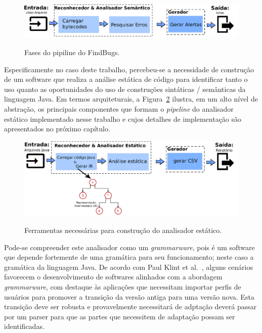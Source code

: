 \begin{figure}[h]
	\center
	\includegraphics[scale=0.9]{Imagens/pipelineFindbugs}
	\label{fig:findBugs}
	\caption{Fases do pipiline do FindBugs.}
\end{figure}


Especificamente no caso deste trabalho, percebeu-se a necessidade de construção de um software que 
realiza a análise estática de código para identificar tanto o uso quanto as oportunidades do uso de construções 
sintáticas / semânticas da linguagem Java. Em termos arquiteturais, a Figura~\ref{fig:stagesAnalyzer} ilustra, 
em um alto nível de abstração, os principais componentes que formam o \emph{pipeline} do analisador estático 
implementado nesse trabalho e cujos detalhes de implementação são apresentados no próximo capítulo.

\begin{figure}[h]
	\center
	\includegraphics[scale=0.9]{Imagens/stagesAnalizer}
	\label{fig:stagesAnalyzer}
	\caption{Ferramentas necessárias para construção do analisador estático.}
\end{figure}


Pode-se compreender este analisador como um \emph{grammarware}, pois é um software 
que depende fortemente de uma gramática para seu funcionamento; neste caso a gramática da linguagem Java. 
De acordo com Paul Klint et al.~\cite{klint2005toward}, alguns cenários favorecem o desenvolvimento de softwares alinhados com a abordagem 
\emph{grammarware}, com destaque às aplicações que necessitam importar perfis de usuários para promover a transição da versão 
antiga para uma versão nova. 
Esta transição deve ser robusta e provavelmente necessitará de adptação deverá passar 
por um parser para que as partes que necessitem de adaptação possam ser identificadas.


